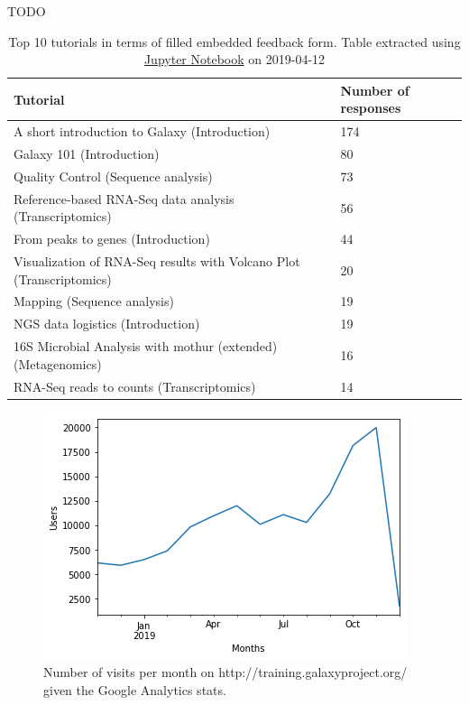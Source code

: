 \documentclass[10pt,letterpaper]{article}
\begin{document}
TODO



\begin{table}[]
	\centering
	\caption{Top 10 tutorials in terms of filled embedded feedback form. Table extracted using \href{https://github.com/bebatut/galaxy-training-material-stats/blob/master/src/extract_repo_content_stats.ipynb}{Jupyter Notebook} on 2019-04-12\label{tbl:toptentutorials}}
	\begin{tabular}{p{}p{}}
		Tutorial                                                             & Number of responses \\\hline
		A short introduction to Galaxy (Introduction)                        & 174 \\
		Galaxy 101 (Introduction)                                            & 80 \\
		Quality Control (Sequence analysis)                                  & 73 \\
		Reference-based RNA-Seq data analysis (Transcriptomics)              & 56 \\
		From peaks to genes (Introduction)                                   & 44 \\
		Visualization of RNA-Seq results with Volcano Plot (Transcriptomics) & 20 \\
		Mapping (Sequence analysis)                                          & 19 \\
		NGS data logistics (Introduction)                                    & 19 \\
		16S Microbial Analysis with mothur (extended) (Metagenomics)         & 16 \\
		RNA-Seq reads to counts (Transcriptomics)                            & 14
	\end{tabular}
\end{table}



\begin{figure}[!ht]
	\centering
	\includegraphics[width=\textwidth]{images/visits-per-month.png}
	\caption{Number of visits per month on http://training.galaxyproject.org/ given the Google Analytics stats.\label{fig:visits}}
\end{figure}
\end{document}
